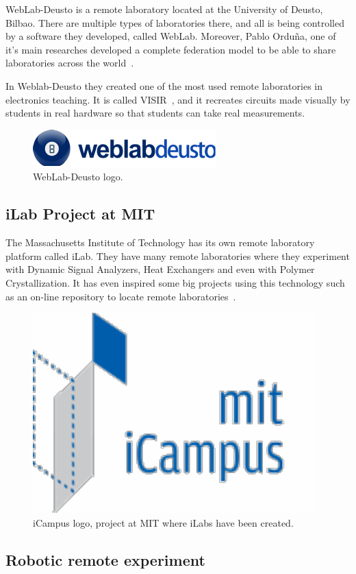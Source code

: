 WebLab-Deusto is a remote laboratory located at the University of Deusto, Bilbao. There are multiple
types of laboratories there, and all is being controlled by a software they developed, called
WebLab. Moreover, Pablo Orduña, one of it's main researches developed a complete federation model
to be able to share laboratories across the world~\cite{porduna_phd}.


In Weblab-Deusto they created one of the most used remote laboratories in electronics teaching. It
is called VISIR~\cite{visir}, and it recreates circuits made visually by students in real hardware
so that students can take real measurements.

\begin{figure}[h]
	\centering
	\includegraphics[width=.4\textwidth]{fig/weblab}
	\caption{WebLab-Deusto logo.}
\end{figure}

\subsection{iLab Project at MIT}

The Massachusetts Institute of Technology has its own remote laboratory platform called iLab. They
have many remote laboratories where they experiment with Dynamic Signal Analyzers, Heat Exchangers
and even with Polymer Crystallization. It has even inspired some big projects using this technology
such as an on-line repository to locate remote laboratories~\cite{ilabs_multi}.

\begin{figure}[h]
	\centering
	\includegraphics[width=.4\textwidth]{fig/icampus}
	\caption{iCampus logo, project at MIT where iLabs have been created.}
\end{figure}

\subsection{Robotic remote experiment}

